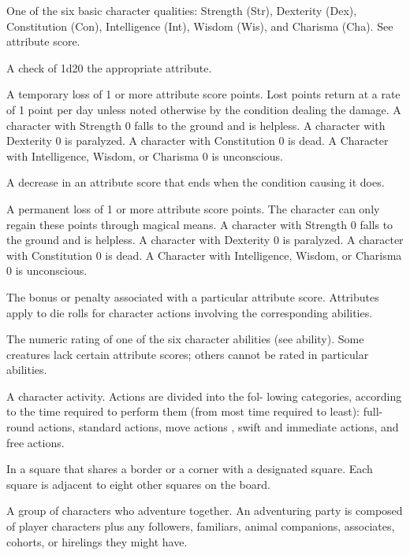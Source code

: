 One of the six basic character qualities: Strength (Str), 
Dexterity (Dex), Constitution (Con), Intelligence (Int), Wisdom 
(Wis), and Charisma (Cha). See attribute score. 

 A check of 1d20 \add the appropriate attribute. 

 A temporary loss of 1 or more attribute score 
points. Lost points return at a rate of 1 point per day unless noted 
otherwise by the condition dealing the damage. A character with 
Strength 0 falls to the ground and is helpless. A character with 
Dexterity 0 is paralyzed. A character with Constitution 0 is dead. A 
Character with Intelligence, Wisdom, or Charisma 0 is unconscious. 

 A decrease in an attribute score that ends when 
the condition causing it does. 

 A permanent loss of 1 or more attribute score points. 
The character can only regain these points through magical means. 
A character with Strength 0 falls to the ground and is helpless. A 
character with Dexterity 0 is paralyzed. A character with 
Constitution 0 is dead. A Character with Intelligence, Wisdom, or 
Charisma 0 is unconscious. 

 The bonus or penalty associated with a particular attribute score. Attributes apply to die rolls for character 
actions involving the corresponding abilities. 

 The numeric rating of one of the six character 
abilities (see ability). Some creatures lack certain attribute scores; 
others cannot be rated in particular abilities. 

 A character activity. Actions are divided into the fol-
lowing categories, according to the time required to perform them 
(from most time required to least): full-round actions, standard 
actions, move actions , swift and immediate actions, and free actions. 

 In a square that shares a border or a corner with a 
designated square. Each square is adjacent to eight other squares on 
the board. 

 A group of characters who adventure 
together. An adventuring party is composed of player characters 
plus any followers, familiars, animal companions, associates, cohorts, or hirelings they might have. 

